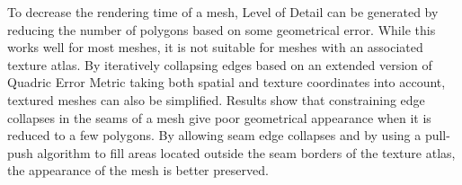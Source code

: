 
To decrease the rendering time of a mesh, Level of Detail can be generated by reducing the number of polygons based on some geometrical error. While this works well for most meshes, it is not suitable for meshes with an associated texture atlas. By iteratively collapsing edges based on an extended version of Quadric Error Metric taking both spatial and texture coordinates into account, textured meshes can also be simplified.
%
Results show that constraining edge collapses in the seams of a mesh give poor geometrical appearance when it is reduced to a few polygons. By allowing seam edge collapses and by using a pull-push algorithm to fill areas located outside the seam borders of the texture atlas, the appearance of the mesh is better preserved.



